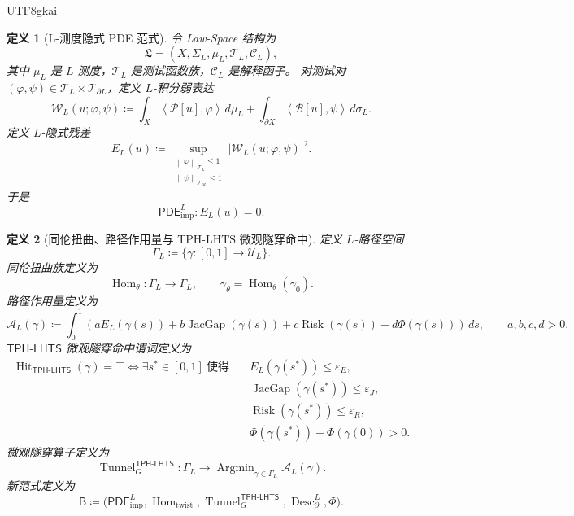 \documentclass[12pt]{article}
\newtheorem{definition}{定义}[section]
\newcommand{\DefEq}{\coloneqq}
\newcommand{\Pcal}{\mathcal P}
\newcommand{\Bcal}{\mathcal B}
\newcommand{\Ucal}{\mathcal U}
\newcommand{\TPHLHTS}{\ensuremath{\mathsf{TPH\mbox{-}LHTS}}}
\newcommand{\PDE}{\ensuremath{\mathsf{PDE}}}
\newcommand{\norm}[1]{\left\lVert #1 \right\rVert}
\newcommand{\ip}[2]{\left\langle #1,#2 \right\rangle}
\DeclareMathOperator{\Hit}{Hit}
\DeclareMathOperator{\JacGap}{JacGap}
\DeclareMathOperator{\Risk}{Risk}
\DeclareMathOperator{\Tunnel}{Tunnel}
\DeclareMathOperator{\Desc}{Desc}
\DeclareMathOperator{\Hom}{Hom}
\DeclareMathOperator*{\Argmin}{Argmin}
\begin{document}
\begin{CJK*}{UTF8}{gkai}
\begin{definition}[L-测度隐式 PDE 范式]
\label{def:tex58-lmeasure-implicit-paradigm}
令 Law-Space 结构为
\[
  \mathfrak L
  =
  (X,\Sigma_L,\mu_L,\mathcal T_L,\mathcal C_L),
\]
其中 \(\mu_L\) 是 \(L\)-测度，\(\mathcal T_L\) 是测试函数族，\(\mathcal C_L\) 是解释函子。
对测试对 \((\varphi,\psi)\in\mathcal T_L\times\mathcal T_{\partial L}\)，定义 \(L\)-积分弱表达
\[
  \mathcal W_L(u;\varphi,\psi)
  \DefEq
  \int_X
  \ip{\Pcal[u]}{\varphi}\,d\mu_L
  +
  \int_{\partial X}
  \ip{\Bcal[u]}{\psi}\,d\sigma_L.
\]
定义 \(L\)-隐式残差
\[
  E_L(u)
  \DefEq
  \sup_{\substack{
    \norm{\varphi}_{\mathcal T_L}\le1\\
    \norm{\psi}_{\mathcal T_{\partial L}}\le1
  }}
  \left|
  \mathcal W_L(u;\varphi,\psi)
  \right|^2.
\]
于是
\[
  \PDE_{\mathrm{imp}}^L
  :
  E_L(u)=0.
\]
\end{definition}

\begin{definition}[同伦扭曲、路径作用量与 TPH-LHTS 微观隧穿命中]
\label{def:tex58-twist-action-hit}
定义 \(L\)-路径空间
\[
  \Gamma_L
  \DefEq
  \{\gamma:[0,1]\to\Ucal_L\}.
\]
同伦扭曲族定义为
\[
  \Hom_{\theta}:\Gamma_L\to\Gamma_L,
  \qquad
  \gamma_{\theta}=\Hom_{\theta}(\gamma_0).
\]
路径作用量定义为
\[
  \mathcal A_L(\gamma)
  \DefEq
  \int_0^1
  \left(
  aE_L(\gamma(s))
  +
  b\JacGap(\gamma(s))
  +
  c\Risk(\gamma(s))
  -
  d\Phi(\gamma(s))
  \right)\,ds,
  \qquad
  a,b,c,d>0.
\]
\TPHLHTS{} 微观隧穿命中谓词定义为
\[
\begin{aligned}
  \Hit_{\TPHLHTS}(\gamma)=\top
  \Longleftrightarrow
  \exists s^\ast\in[0,1]\ \text{使得}\quad
  &E_L(\gamma(s^\ast))\le\varepsilon_E,\\
  &\JacGap(\gamma(s^\ast))\le\varepsilon_J,\\
  &\Risk(\gamma(s^\ast))\le\varepsilon_R,\\
  &\Phi(\gamma(s^\ast))-\Phi(\gamma(0))>0.
\end{aligned}
\]
微观隧穿算子定义为
\[
  \Tunnel_G^{\TPHLHTS}
  :
  \Gamma_L
  \to
  \Argmin_{\gamma\in\Gamma_L}\mathcal A_L(\gamma).
\]
新范式定义为
\[
  \mathsf{B}
  \DefEq
  \bigl(
  \PDE_{\mathrm{imp}}^L,
  \Hom_{\mathrm{twist}},
  \Tunnel_G^{\TPHLHTS},
  \Desc_{\partial}^{L},
  \Phi
  \bigr).
\]
\end{definition}


\end{CJK*}
\end{document}

